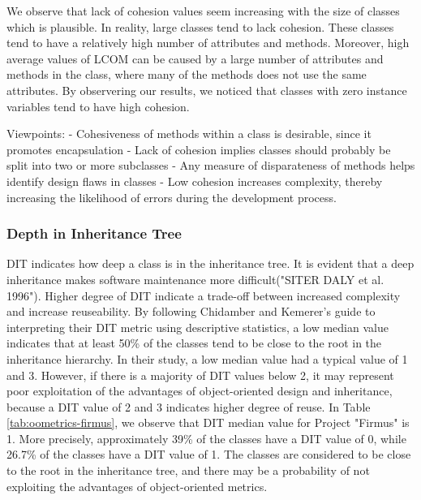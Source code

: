 We observe that lack of cohesion values seem increasing with the size of classes which is plausible. In reality, large classes tend to lack cohesion. These classes tend to have a relatively high number of attributes and methods. Moreover, high average values of LCOM can be caused by a large number of attributes and methods in the class, where many of the methods does not use the same attributes. By observering our results, we noticed that classes with zero instance variables tend to have high cohesion.

Viewpoints: 
- Cohesiveness of methods within a class is desirable, since it promotes encapsulation
- Lack of cohesion implies classes should probably be split into two or more subclasses
- Any measure of disparateness of methods helps identify design flaws in classes
- Low cohesion increases complexity, thereby increasing the likelihood of errors during the development process.




\subsubsection{Depth in Inheritance Tree}
DIT indicates how deep a class is in the inheritance tree. It is evident that a deep inheritance makes software maintenance more difficult("SITER DALY et al. 1996"). Higher degree of DIT indicate a trade-off between increased complexity and increase reuseability. By following Chidamber and Kemerer's\cite{chidamber1994metrics} guide to interpreting their DIT metric using descriptive statistics, a low median value indicates that at least 50\% of the classes tend to be close to the root in the inheritance hierarchy. In their study, a low median value had a typical value of 1 and 3. However, if there is a majority of DIT values below 2, it may represent poor exploitation of the advantages of object-oriented design and inheritance, because a DIT value of 2 and 3 indicates higher degree of reuse. In Table \ref{tab:oometrics-firmus}, we observe that DIT median value for Project "Firmus" is 1. More precisely, approximately 39\% of the classes have a DIT value of 0, while 26.7\% of the classes have a DIT value of 1. The classes are considered to be close to the root in the inheritance tree, and there may be a probability of not exploiting the advantages of object-oriented metrics.

